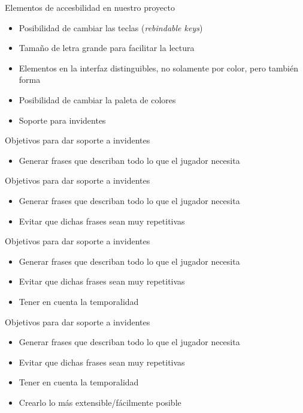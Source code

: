 \begin{tframe}{Elementos de accesbilidad en nuestro proyecto}
	\begin{itemize}
		\item Posibilidad de cambiar las teclas (\textit{rebindable keys})
		\item Tamaño de letra grande para facilitar la lectura
		\item Elementos en la interfaz distinguibles, no solamente por color, pero también forma
		\item Posibilidad de cambiar la paleta de colores
		\item<+-| alert@+> Soporte para invidentes
	\end{itemize}
\end{tframe}


\begin{tframe}{Objetivos para dar soporte a invidentes}
	\begin{itemize}
		\item<+-| alert@+> Generar frases que describan todo lo que el jugador necesita		
	\end{itemize}
\end{tframe}

\begin{tframe}{Objetivos para dar soporte a invidentes}
	\begin{itemize}
		\item Generar frases que describan todo lo que el jugador necesita
		\item<+-| alert@+> Evitar que dichas frases sean muy repetitivas
	\end{itemize}
\end{tframe}

\begin{tframe}{Objetivos para dar soporte a invidentes}
	\begin{itemize}
		\item Generar frases que describan todo lo que el jugador necesita
		\item Evitar que dichas frases sean muy repetitivas
		\item<+-| alert@+> Tener en cuenta la temporalidad
	\end{itemize}
\end{tframe}

\begin{tframe}{Objetivos para dar soporte a invidentes}
	\begin{itemize}
		\item Generar frases que describan todo lo que el jugador necesita
		\item Evitar que dichas frases sean muy repetitivas
		\item Tener en cuenta la temporalidad
		\item<+-| alert@+> Crearlo lo más extensible/fácilmente posible
	\end{itemize}
\end{tframe}

